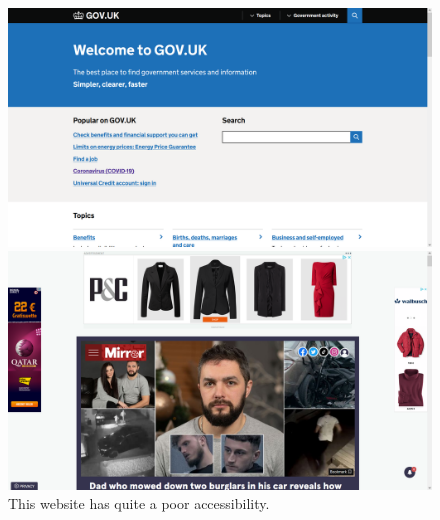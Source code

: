 \begin{figure}[tp]
    \begin{minipage}{0.48\linewidth}
        \centering
        \includegraphics[keepaspectratio,width=\linewidth]
        {images/gov}
        
        \caption[www.gov.uk]
        {%
        This website is good example of accessible website.
        }
        \label{fig:gov}
    \end{minipage}\hfill
    \begin{minipage}{0.48\linewidth}
        \centering
        \includegraphics[keepaspectratio,width=\linewidth]
        {images/mirror}
        
        \caption[www.mirror.co.uk]
        {%
        This website has quite a poor accessibility.
        }
        \label{fig:mirror}
    \end{minipage}
\end{figure}
